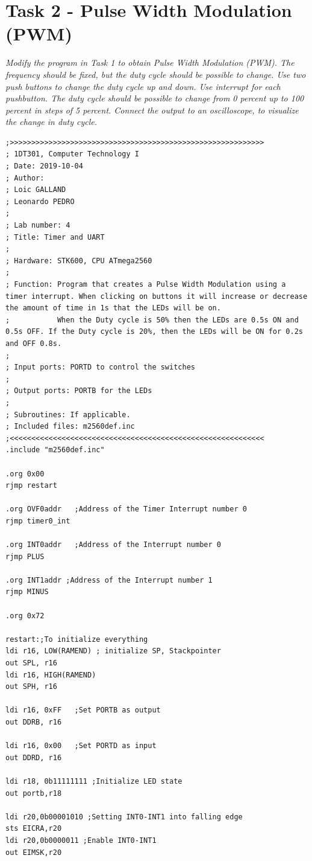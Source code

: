\documentclass[a4paper,12pt]{article}
\begin{document}
\section{Task 2 - Pulse Width Modulation (PWM)}
\textit{Modify the program in Task 1 to obtain Pulse Width Modulation (PWM). The frequency should be
fixed, but the duty cycle should be possible to change. Use two push buttons to change the duty
cycle up and down. Use interrupt for each pushbutton. The duty cycle should be possible to
change from 0 percent up to 100 percent in steps of 5 percent. Connect the output to an oscilloscope, to visualize
the change in duty cycle.}

\lstset{style=Asm}
\begin{lstlisting}
;>>>>>>>>>>>>>>>>>>>>>>>>>>>>>>>>>>>>>>>>>>>>>>>>>>>>>>>>>>>
; 1DT301, Computer Technology I
; Date: 2019-10-04
; Author:
; Loic GALLAND
; Leonardo PEDRO
;
; Lab number: 4
; Title: Timer and UART
;
; Hardware: STK600, CPU ATmega2560
;
; Function: Program that creates a Pulse Width Modulation using a timer interrupt. When clicking on buttons it will increase or decrease the amount of time in 1s that the LEDs will be on.
;			When the Duty cycle is 50% then the LEDs are 0.5s ON and 0.5s OFF. If the Duty cycle is 20%, then the LEDs will be ON for 0.2s and OFF 0.8s.
; 
; Input ports: PORTD to control the switches
;
; Output ports: PORTB for the LEDs 
;
; Subroutines: If applicable.
; Included files: m2560def.inc
;<<<<<<<<<<<<<<<<<<<<<<<<<<<<<<<<<<<<<<<<<<<<<<<<<<<<<<<<<<<
.include "m2560def.inc"

.org 0x00
rjmp restart

.org OVF0addr	;Address of the Timer Interrupt number 0
rjmp timer0_int

.org INT0addr	;Address of the Interrupt number 0
rjmp PLUS

.org INT1addr ;Address of the Interrupt number 1
rjmp MINUS

.org 0x72

restart:;To initialize everything
ldi r16, LOW(RAMEND) ; initialize SP, Stackpointer
out SPL, r16
ldi r16, HIGH(RAMEND)
out SPH, r16

ldi r16, 0xFF	;Set PORTB as output
out DDRB, r16

ldi r16, 0x00	;Set PORTD as input
out DDRD, r16

ldi r18, 0b11111111	;Initialize LED state
out portb,r18

ldi r20,0b00001010 ;Setting INT0-INT1 into falling edge
sts EICRA,r20
ldi r20,0b0000011 ;Enable INT0-INT1
out EIMSK,r20


\end{lstlisting}
\end{document}
